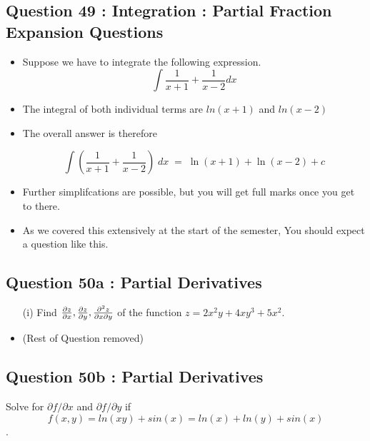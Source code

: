 \documentclass[]{article}
\begin{document}
\subsection*{Question 49 : Integration : Partial Fraction Expansion Questions}
\begin{itemize}
	\item Suppose we have to integrate the following expression.
	\[\int \frac {1}{x+1} +\frac{1}{x-2} dx \]
	\item The integral of both individual terms are $ ln (x+1) $ and $ln (x-2) $
	
	\item The overall answer is therefore 
	
	\[ \int \left( \frac{1}{x+1} +\frac{1}{x-2}\right)\; dx \; =\; \ln (x+1) + \ln (x-2) + c\]
	
	\item Further simplifcations are possible, but you will get full marks once you get to there.
	\item As we covered this extensively at the start of the semester, You should expect a question like this.
\end{itemize}


\newpage

\subsection*{Question 50a : Partial Derivatives}
\begin{itemize}
	\item[(i)] Find ${ \partial{z} \over \partial{x} }, { \partial{z} \over \partial{y} }, { \partial^2{z} \over \partial{x}\partial{y} }$ 
	of the function $z = 2x^2y+4xy^3+5x^2$.		             
	
\item (Rest of Question removed)
\end{itemize}


\subsection*{Question 50b : Partial Derivatives}


Solve for $\displaystyle{\partial f/\partial x}$ and $\displaystyle{\partial f/\partial y}$ if \[f(x,y)= ln(xy) +sin(x) = ln(x) + ln(y)+ sin(x)\].
\end{document}
